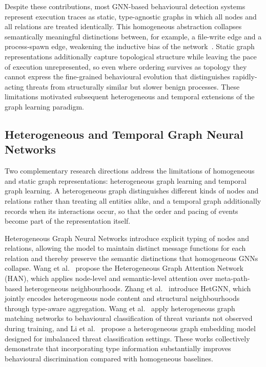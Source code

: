 \documentclass[%
    BCOR=10mm,
    DIV=13,
    toc=bibliography,
    toc=listof,
    oneside,
    12pt,
]{scrbook}
\begin{document}
Despite these contributions, most GNN-based behavioural detection systems
represent execution traces as static, type-agnostic graphs in which all nodes
and all relations are treated identically. This homogeneous abstraction
collapses semantically meaningful distinctions between, for example, a
file-write edge and a process-spawn edge, weakening the inductive bias of the
network~\cite{bilot2024survey}. Static graph representations additionally
capture topological structure while leaving the pace of execution
unrepresented, so even where ordering survives as topology they cannot express
the fine-grained behavioural evolution that distinguishes rapidly-acting
threats from structurally similar but slower benign processes. These
limitations motivated subsequent heterogeneous and temporal extensions of the
graph learning paradigm.

\subsection{Heterogeneous and Temporal Graph Neural Networks}
\label{subsec:hetero_tgnn}

Two complementary research directions address the limitations of homogeneous
and static graph representations: heterogeneous graph learning and temporal
graph learning. A heterogeneous graph distinguishes different kinds of nodes
and relations rather than treating all entities alike, and a temporal graph
additionally records when its interactions occur, so that the order and
pacing of events become part of the representation itself.

Heterogeneous Graph Neural Networks introduce explicit typing of nodes and
relations, allowing the model to maintain distinct message functions for each
relation and thereby preserve the semantic distinctions that homogeneous GNNs
collapse. Wang et al.~\cite{han2019} propose the Heterogeneous Graph Attention
Network (HAN), which applies node-level and semantic-level attention over
meta-path-based heterogeneous neighbourhoods. Zhang et al.~\cite{hetgnn2019}
introduce HetGNN, which jointly encodes heterogeneous node content and
structural neighbourhoods through type-aware aggregation. Wang et
al.~\cite{wang2019matchgnet} apply heterogeneous graph matching networks to
behavioural classification of threat variants not observed during training,
and Li et al.~\cite{li2024imbalanced} propose a heterogeneous graph embedding
model designed for imbalanced threat classification settings. These works
collectively demonstrate that incorporating type information substantially
improves behavioural discrimination compared with homogeneous baselines.
\end{document}
